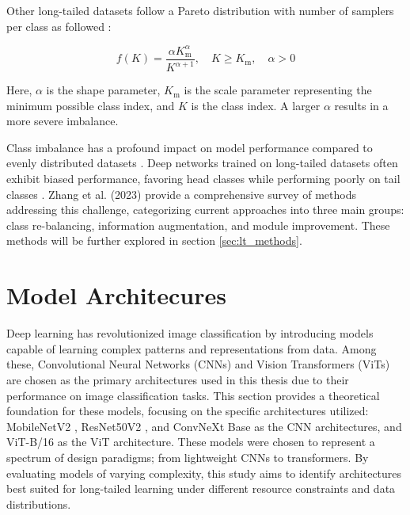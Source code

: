 Other long-tailed datasets follow a Pareto distribution with number of samplers per class as followed \cite{liu2019largescalelongtailedrecognitionopen}:

\begin{equation}
    \label{eq:pareto}
    f(K) = \frac{\alpha K_{\text{m}}^\alpha}{K^{\alpha + 1}}, \quad K \geq K_{\text{m}}, \quad \alpha > 0
\end{equation}

Here, $\alpha$ is the shape parameter, $K_{\text{m}}$ is the scale parameter representing the minimum possible class index, and $K$ is the class index. A larger $\alpha$ results in a more severe imbalance.



Class imbalance has a profound impact on model performance compared to evenly distributed datasets \cite{vanhorn2017deviltailsfinegrainedclassification, cui2019classbalancedlossbasedeffective}. Deep networks trained on long-tailed datasets often exhibit biased performance, favoring head classes while performing poorly on tail classes \cite{zhang2023deep}. Zhang et al. (2023) provide a comprehensive survey of methods addressing this challenge, categorizing current approaches into three main groups: class re-balancing, information augmentation, and module improvement. These methods will be further explored in section \ref{sec:lt_methods}. 





\section{Model Architecures}
\label{sec:model_arch}
Deep learning has revolutionized image classification by introducing models capable of learning complex patterns and representations from data. Among these, Convolutional Neural Networks (CNNs) and Vision Transformers (ViTs) are chosen as the primary architectures used in this thesis due to their performance on image classification tasks. This section provides a theoretical foundation for these models, focusing on the specific architectures utilized: MobileNetV2 \cite{sandler2018mobilenetv2}, ResNet50V2 \cite{he2015deepresiduallearningimage}, and ConvNeXt Base \cite{todi2023convnext} as the CNN architectures, and ViT-B/16 \cite{dosovitskiy2021imageworth16x16words} as the ViT architecture.
These models were chosen to represent a spectrum of design paradigms; from lightweight CNNs to transformers. By evaluating models of varying complexity, this study aims to identify architectures best suited for long-tailed learning under different resource constraints and data distributions.


